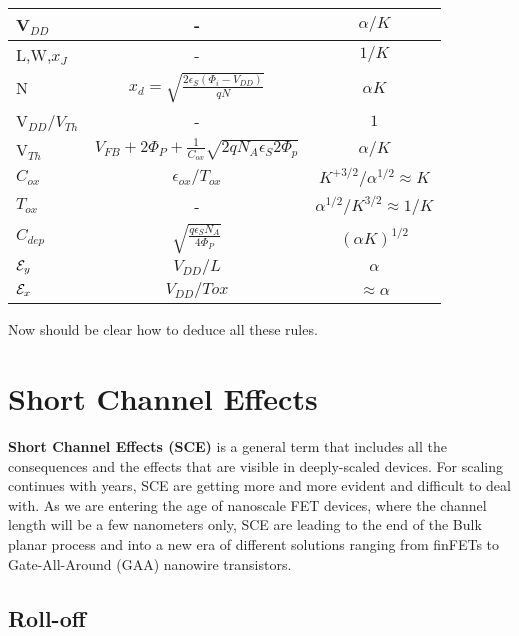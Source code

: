 \documentclass[a4paper, 12pt, twoside, openright]{report}
\begin{document}
{{{{\begin{table}[H]
{
   \begin{center}
  {
     \begin{tabular}{||l||c|c||}\hline
      V$_{DD}$ & -& $ {\alpha/K}$\\
      \hline
      L,W,$x_J$       &- & $ {1/K}$\\
      \hline
      N & $x_d=\sqrt{\frac{2\epsilon_S(\Phi_i-V_{DD})}{qN}}$&$ {\alpha K}$ \\
      \hline
      V$_{DD}/V_{Th}$ &- & ${1}$\\
      \hline
      V$_{Th}$ & $V_{FB}+2\Phi_P+\frac{1}{C_{ox}}\sqrt{2qN_A\epsilon_S 2\Phi_p}$  & $ {\alpha/K}$\\
      \hline
       $C_{ox}$&  $\epsilon_{ox}/T_{ox}$ &$ {K}^{+3/2}/\alpha^{1/2}\approx K $\\ 
      \hline
      $T_{ox}$       &- & $ {\alpha^{1/2}/{K}^{3/2}}\approx 1/K$\\
      \hline
       $C_{dep}$&  $\sqrt{\frac{q\epsilon_SN_A}{4\Phi_P}}$ &$ {(\alpha K)}^{1/2}$\\ 
      \hline
      ${\cal E}_y$ & $V_{DD}/L$ & $ {\alpha}$\\
      \hline
      ${\cal E}_x$ & $V_{DD}/Tox$ & $ {\approx \alpha}$\\
      \hline
     \end{tabular}
}
    \end{center}
}
\end{table}

Now should be clear how to deduce all these rules.

\newpage



\section{Short Channel Effects}

\textbf{Short Channel Effects (SCE)} is a general term that includes all the consequences and the effects that are visible in deeply-scaled devices. For scaling continues with years, SCE are getting more and more evident and difficult to deal with. As we are entering the age of nanoscale FET devices, where the channel length will be a few nanometers only, SCE are leading to the end of the Bulk planar process and into a new era of different solutions ranging from finFETs to Gate-All-Around (GAA) nanowire transistors. 

\subsection{Roll-off} \label{subsec:roll_off}


}}}}
\end{document}
